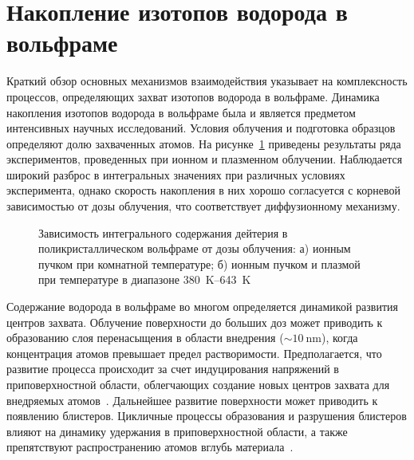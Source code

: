 \section{Накопление изотопов водорода в вольфраме}\label{sec:ch1/sec5}

Краткий обзор основных механизмов взаимодействия указывает на комплексность процессов, определяющих захват изотопов водорода в вольфраме. Динамика накопления изотопов водорода в вольфраме была и является предметом интенсивных научных исследований. Условия облучения и подготовка образцов определяют долю захваченных атомов. На рисунке~\cref{fig:ch1/retention_fluence} приведены результаты ряда экспериментов, проведенных при ионном и плазменном облучении. Наблюдается широкий разброс в интегральных значениях при различных условиях эксперимента, однако скорость накопления в них хорошо согласуется с корневой зависимостью от дозы облучения, что соответствует диффузионному механизму.  

\begin{figure}[ht]
    \caption{Зависимость интегрального содержания дейтерия в поликристаллическом вольфраме от дозы облучения: а) ионным пучком при комнатной температуре; б) ионным пучком и плазмой при температуре в диапазоне \SIrange{380}{643}{\kelvin}~\cite{HarutunyanThesis}}\label{fig:ch1/retention_fluence}
\end{figure}

Содержание водорода в вольфраме во многом определяется динамикой развития центров захвата. Облучение поверхности до больших доз может приводить к образованию слоя перенасыщения в области внедрения (\( \sim \SI{10}{\nano\meter} \)), когда концентрация атомов превышает предел растворимости. Предполагается, что развитие процесса происходит за счет индуцирования напряжений в приповерхностной области, облегчающих создание новых центров захвата для внедряемых атомов~\cite{Nishijima2023}. Дальнейшее развитие поверхности может приводить к появлению блистеров. Цикличные процессы образования и разрушения блистеров влияют на динамику удержания в приповерхностной области, а также препятствуют распространению атомов вглубь материала~\cite{Bauer2017}.  

